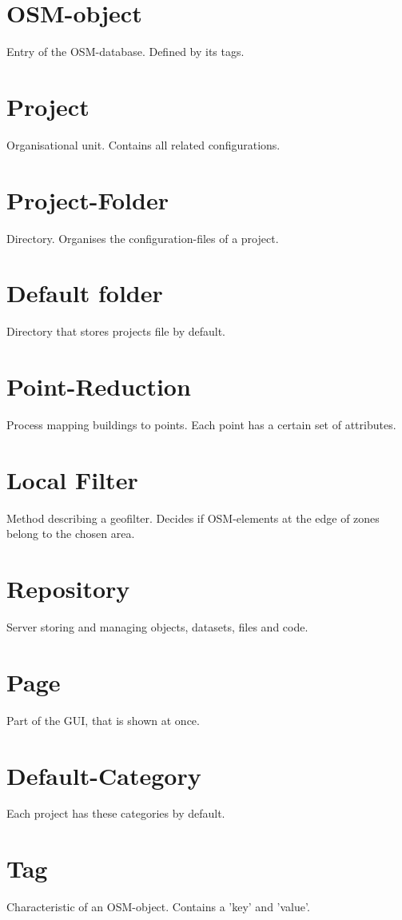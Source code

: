 \documentclass[letterpaper,10pt,english]{sphinxmanual}
\begin{document}
\section*{OSM-object}
Entry of the OSM-database. Defined by its tags.

\section*{Project}
Organisational unit. Contains all related configurations.

\section*{Project-Folder}
Directory. Organises the configuration-files of a project.

\section*{Default folder}
Directory that stores projects file by default.

\section*{Point-Reduction}
Process mapping buildings to points. Each point has a certain set of attributes.

\section*{Local Filter}
Method describing a geofilter. Decides if OSM-elements at the edge of zones belong to the chosen area. 

\section*{Repository}
Server storing and managing objects, datasets, files and code.

\section*{Page}
Part of the GUI, that is shown at once.

\section*{Default-Category}
Each project has these categories by default.

\section*{Tag}
Characteristic of an OSM-object. Contains a 'key' and 'value'.
\end{document}
